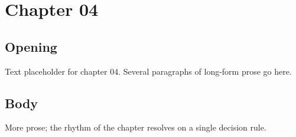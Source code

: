 \chapter{Chapter 04}
\section{Opening}
Text placeholder for chapter 04. Several paragraphs of long-form prose go here.
\section{Body}
More prose; the rhythm of the chapter resolves on a single decision rule.
